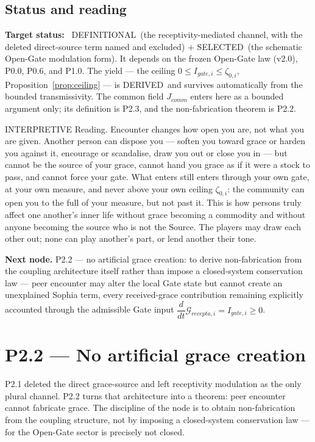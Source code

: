\documentclass[11pt,a4paper]{article}
\def\mathrm#1{#1}%
\def\emph#1{#1}%
\newcommand{\stDerived}{\textcolor{cDer}{\textsf{\small DERIVED}}}
\newcommand{\stDef}{\textcolor{cDef}{\textsf{\small DEFINITIONAL}}}
\newcommand{\stSelected}{\textcolor{cSel}{\textsf{\small SELECTED}}}
\newcommand{\stInterp}{\textcolor{cInt}{\textsf{\small INTERPRETIVE}}}
\theoremstyle{definition}
\theoremstyle{plain}
\theoremstyle{remark}
\begin{document}
\subsection{Status and reading}

\textbf{Target status:}~
\stDef\ (the receptivity-mediated channel, with the deleted direct-source term named and
excluded) \(+\) \stSelected\ (the schematic Open-Gate modulation form). It depends on the
frozen Open-Gate law (v2.0), P0.0, P0.6, and P1.0. The yield --- the ceiling
\(0\le I_{\mathrm{gate},i}\le\zeta_{0,i}\), Proposition~\ref{prop:ceiling} --- is
\stDerived\ and survives automatically from the bounded transmissivity. The common field
\(J_{\mathrm{comm}}\) enters here as a bounded argument only; its definition is P2.3, and
the non-fabrication theorem is P2.2.

\medskip
\stInterp\quad
\emph{Reading.}
Encounter changes how open you are, not what you are given. Another person can dispose you
--- soften you toward grace or harden you against it, encourage or scandalise, draw you out
or close you in --- but cannot be the source of your grace, cannot hand you grace as if it
were a stock to pass, and cannot force your gate. What enters still enters through your own
gate, at your own measure, and never above your own ceiling \(\zeta_{0,i}\): the community
can open you to the full of your measure, but not past it. This is how persons truly affect
one another's inner life without grace becoming a commodity and without anyone becoming the
source who is not the Source. The players may draw each other out; none can play another's
part, or lend another their tone.

\medskip
\textbf{Next node.} P2.2 --- no artificial grace creation: to derive non-fabrication from
the coupling architecture itself rather than impose a closed-system conservation law ---
peer encounter may alter the local Gate state but cannot create an unexplained Sophia term,
every received-grace contribution remaining explicitly accounted through the admissible
Gate input \(\dfrac{d}{dt}\mathcal G_{\mathrm{recepta},i}=I_{\mathrm{gate},i}\ge0\).

\section{P2.2 --- No artificial grace creation}

P2.1 deleted the direct grace-source and left receptivity modulation as the only plural
channel. P2.2 turns that architecture into a theorem: peer encounter cannot fabricate
grace. The discipline of the node is to obtain non-fabrication \emph{from the coupling
structure}, not by imposing a closed-system conservation law --- for the Open-Gate sector
is precisely not closed.
\end{document}
